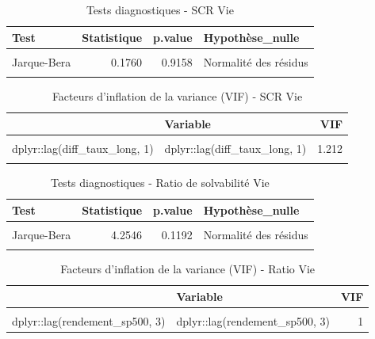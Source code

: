 \documentclass[
]{article}
\begin{document}
\begin{longtable}[t]{lrrl}
\caption{\label{tab:unnamed-chunk-47}Tests diagnostiques - SCR Vie}\\
\toprule
Test & Statistique & p.value & Hypothèse\_nulle\\
\midrule
\cellcolor{gray!10}{Ljung-Box} & \cellcolor{gray!10}{0.0971} & \cellcolor{gray!10}{0.7554} & \cellcolor{gray!10}{Pas d'autocorrélation}\\
Jarque-Bera & 0.1760 & 0.9158 & Normalité des résidus\\
\cellcolor{gray!10}{Breusch-Pagan} & \cellcolor{gray!10}{1.7255} & \cellcolor{gray!10}{0.7861} & \cellcolor{gray!10}{Homoscédasticité}\\
\bottomrule
\end{longtable}

\begin{longtable}[t]{llr}
\caption{\label{tab:unnamed-chunk-47}Facteurs d'inflation de la variance (VIF) - SCR Vie}\\
\toprule
 & Variable & VIF\\
\midrule
\cellcolor{gray!10}{dplyr::lag(diff\_scr, 1)} & \cellcolor{gray!10}{dplyr::lag(diff\_scr, 1)} & \cellcolor{gray!10}{1.054}\\
dplyr::lag(diff\_taux\_long, 1) & dplyr::lag(diff\_taux\_long, 1) & 1.212\\
\cellcolor{gray!10}{dplyr::lag(diff\_ipc, 3)} & \cellcolor{gray!10}{dplyr::lag(diff\_ipc, 3)} & \cellcolor{gray!10}{1.243}\\
\bottomrule
\end{longtable}

\begin{longtable}[t]{lrrl}
\caption{\label{tab:unnamed-chunk-48}Tests diagnostiques - Ratio de solvabilité Vie}\\
\toprule
Test & Statistique & p.value & Hypothèse\_nulle\\
\midrule
\cellcolor{gray!10}{Ljung-Box} & \cellcolor{gray!10}{0.6204} & \cellcolor{gray!10}{0.4309} & \cellcolor{gray!10}{Pas d'autocorrélation}\\
Jarque-Bera & 4.2546 & 0.1192 & Normalité des résidus\\
\cellcolor{gray!10}{Breusch-Pagan} & \cellcolor{gray!10}{3.5422} & \cellcolor{gray!10}{0.1701} & \cellcolor{gray!10}{Homoscédasticité}\\
\bottomrule
\end{longtable}

\begin{longtable}[t]{llr}
\caption{\label{tab:unnamed-chunk-48}Facteurs d'inflation de la variance (VIF) - Ratio Vie}\\
\toprule
 & Variable & VIF\\
\midrule
\cellcolor{gray!10}{dplyr::lag(diff\_ratio, 1)} & \cellcolor{gray!10}{dplyr::lag(diff\_ratio, 1)} & \cellcolor{gray!10}{1}\\
dplyr::lag(rendement\_sp500, 3) & dplyr::lag(rendement\_sp500, 3) & 1\\
\bottomrule
\end{longtable}
\end{document}
